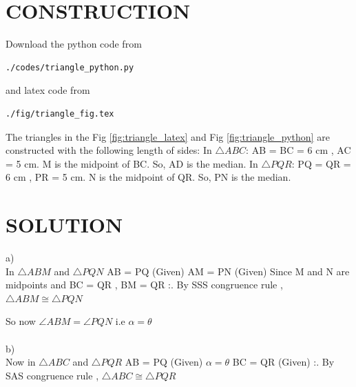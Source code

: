\documentclass[journal,12pt,twocolumn]{IEEEtran}
\begin{document}
\section{CONSTRUCTION}
Download the python code from
\begin{lstlisting}
./codes/triangle_python.py
\end{lstlisting}
and latex code from
\begin{lstlisting}
./fig/triangle_fig.tex
\end{lstlisting}

The triangles in the Fig \ref{fig:triangle_latex} and Fig \ref{fig:triangle_python} are constructed with the following length of sides:
\newline
In $\triangle ABC$: AB = BC = 6 cm , AC = 5 cm. M is the midpoint of BC. So, AD is the median.
\newline
In $\triangle PQR$: PQ = QR = 6 cm , PR = 5 cm. N is the midpoint of QR. So, PN is the median.




\section{SOLUTION}

\noindent a) \\
    In $\triangle ABM$  and  $\triangle PQN$ \newline 
    AB = PQ (Given)  \newline
    AM = PN (Given) \newline
    Since M and N are midpoints and BC = QR , \newline
    BM = QR  \newline
    :. By SSS congruence rule , $\triangle ABM \cong \triangle PQN$  \newline
    
        So now $\angle ABM = \angle PQN$ i.e $\alpha = \theta$
    \newline
    \\
    \\
b) \\   
Now in $\triangle ABC$  and  $\triangle PQR$ \newline 
AB = PQ (Given)  \newline
$\alpha = \theta$ \newline
BC = QR (Given)\newline
:. By SAS congruence rule , $\triangle ABC \cong \triangle PQR$ 
    
\end{document}
